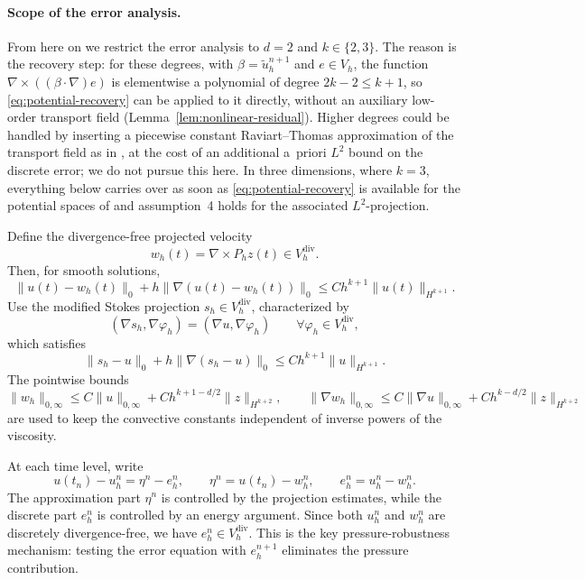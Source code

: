 \documentclass[11pt]{article}
\theoremstyle{remark}\newtheorem{remark}{Remark}
\newcommand{\Vh}{V_h}\newcommand{\Qh}{Q_h}
\newcommand{\Vdivh}{V_h^{\mathrm{div}}}
\newcommand{\tu}{\tilde u_h}
\newcommand{\Ph}{P_h}
\theoremstyle{plain}
\newcommand{\new}[1]{{\color{blue}#1}}
\begin{document}
\new{\paragraph{Scope of the error analysis.} From here on we restrict the error analysis to $d=2$ and $k\in\{2,3\}$. The reason is the recovery step: for these degrees, with $\beta=\tu^{n+1}$ and $e\in\Vh$, the function $\nabla\times((\beta\cdot\nabla)e)$ is elementwise a polynomial of degree $2k-2\le k+1$, so \eqref{eq:potential-recovery} can be applied to it directly, without an auxiliary low-order transport field (Lemma~\ref{lem:nonlinear-residual}). Higher degrees could be handled by inserting a piecewise constant Raviart--Thomas approximation of the transport field as in \cite{BBCG24}, at the cost of an additional a~priori $L^2$ bound on the discrete error; we do not pursue this here. In three dimensions, where $k=3$, everything below carries over as soon as \eqref{eq:potential-recovery} is available for the potential spaces of \cite{FGN20} and assumption~4 holds for the associated $L^2$-projection.}
Define the divergence-free projected velocity
\[w_h(t)=\nabla\times\Ph z(t)\in\Vdivh.\]
Then, for smooth solutions,
\[\|u(t)-w_h(t)\|_0+h\|\nabla(u(t)-w_h(t))\|_0\le Ch^{k+1}\|u(t)\|_{H^{k+1}}.\]
Use the modified Stokes projection $s_h\in\Vdivh$, characterized by
\[(\nabla s_h,\nabla\varphi_h)=(\nabla u,\nabla\varphi_h)\qquad\forall\varphi_h\in\Vdivh,\]
which satisfies
\[\|s_h-u\|_0+h\|\nabla(s_h-u)\|_0\le Ch^{k+1}\|u\|_{H^{k+1}}.\]
The pointwise bounds
\begin{equation}
    \|w_h\|_{0,\infty}\le C\|u\|_{0,\infty}+Ch^{k+1-d/2}\|z\|_{H^{k+2}},\qquad\|\nabla w_h\|_{0,\infty}\le C\|\nabla u\|_{0,\infty}+Ch^{k-d/2}\|z\|_{H^{k+2}}
\end{equation}
are used to keep the convective constants independent of inverse powers of the viscosity.

At each time level, write
\[u(t_n)-u_h^n=\eta^n-e_h^n,\qquad\eta^n=u(t_n)-w_h^n,\qquad e_h^n=u_h^n-w_h^n.\]
The approximation part $\eta^n$ is controlled by the projection estimates, while the discrete part $e_h^n$ is controlled by an energy argument. Since both $u_h^n$ and $w_h^n$ are discretely divergence-free, we have $e_h^n\in\Vdivh$. This is the key pressure-robustness mechanism: testing the error equation with $e_h^{n+1}$ eliminates the pressure contribution.
\end{document}
